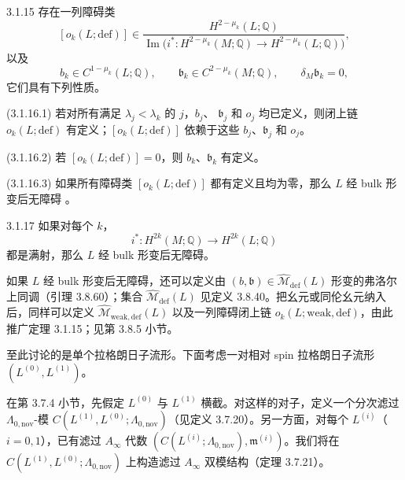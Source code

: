 \begin{theorem}{3.1.15}\label{thm:3-1-15}
存在一列障碍类
\[
  [o_k(L;\mathrm{def})]
  \in
  \frac{H^{2-\mu_k}(L;\mathbb Q)}
  {\operatorname{Im}\bigl(i^*\colon
    H^{2-\mu_k}(M;\mathbb Q)
    \to H^{2-\mu_k}(L;\mathbb Q)\bigr)},
\]
以及
\[
  b_k\in C^{1-\mu_k}(L;\mathbb Q),
  \qquad
  \mathfrak b_k\in C^{2-\mu_k}(M;\mathbb Q),
  \qquad
  \delta_M\mathfrak b_k=0,
\]
它们具有下列性质。

\smallskip
\noindent\textup{(3.1.16.1)}
若对所有满足 $\lambda_j<\lambda_k$ 的 $j$，$b_j$、
$\mathfrak b_j$ 和 $o_j$ 均已定义，则闭上链
$o_k(L;\mathrm{def})$ 有定义；$[o_k(L;\mathrm{def})]$ 依赖于这些
$b_j$、$\mathfrak b_j$ 和 $o_j$。

\noindent\textup{(3.1.16.2)}
若 $[o_k(L;\mathrm{def})]=0$，则 $b_k$、$\mathfrak b_k$ 有定义。

\noindent\textup{(3.1.16.3)}
如果所有障碍类 $[o_k(L;\mathrm{def})]$ 都有定义且均为零，那么
$L$ 经 bulk 形变后无障碍
。
\end{theorem}

\begin{corollary}{3.1.17}\label{cor:3-1-17}
如果对每个 $k$，
\[
  i^*\colon H^{2k}(M;\mathbb Q)\longrightarrow H^{2k}(L;\mathbb Q)
\]
都是满射，那么 $L$ 经 bulk 形变后无障碍。
\end{corollary}

如果 $L$ 经 bulk 形变后无障碍，还可以定义由
$(b,\mathfrak b)\in\widehat{\mathcal M}_{\mathrm{def}}(L)$ 形变的弗洛尔上同调（引理 3.8.60）；集合
$\widehat{\mathcal M}_{\mathrm{def}}(L)$ 见定义 3.8.40。把幺元或同伦幺元纳入后，同样可以定义
$\widehat{\mathcal M}_{\mathrm{weak,def}}(L)$ 以及一列障碍闭上链
$o_k(L;\mathrm{weak,def})$，由此推广定理 3.1.15；见第 3.8.5 小节。

至此讨论的是单个拉格朗日子流形。下面考虑一对相对 spin 拉格朗日子流形
$(L^{(0)},L^{(1)})$。

在第 3.7.4 小节，先假定 $L^{(0)}$ 与 $L^{(1)}$ 横截。对这样的对子，定义一个分次滤过
$\Lambda_{0,\mathrm{nov}}$-模
$C(L^{(1)},L^{(0)};\Lambda_{0,\mathrm{nov}})$（见定义 3.7.20）。另一方面，对每个
$L^{(i)}$（$i=0,1$），已有滤过 $A_\infty$ 代数
$(C(L^{(i)};\Lambda_{0,\mathrm{nov}}),\mathfrak m^{(i)})$。我们将在
$C(L^{(1)},L^{(0)};\Lambda_{0,\mathrm{nov}})$ 上构造滤过 $A_\infty$ 双模结构（定理 3.7.21）。

